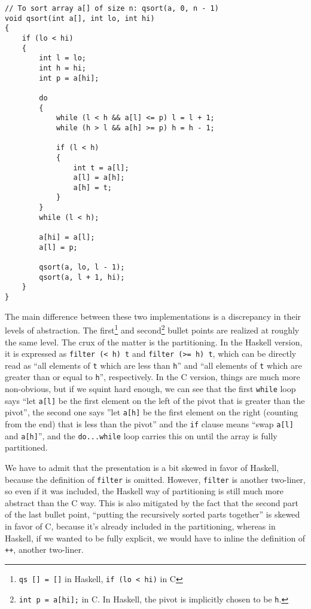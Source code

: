 \documentclass[declaration,mgr,english,shortabstract]{iithesis}
\newcommand{\m}[1]{\texttt{#1}}
\begin{document}
\begin{verbatim}
// To sort array a[] of size n: qsort(a, 0, n - 1)
void qsort(int a[], int lo, int hi)
{
    if (lo < hi)
    {
        int l = lo;
        int h = hi;
        int p = a[hi];

        do
        {
            while (l < h && a[l] <= p) l = l + 1;
            while (h > l && a[h] >= p) h = h - 1;

            if (l < h)
            {
                int t = a[l];
                a[l] = a[h];
                a[h] = t;
            }
        }
        while (l < h);

        a[hi] = a[l];
        a[l] = p;

        qsort(a, lo, l - 1);
        qsort(a, l + 1, hi);
    }
}
\end{verbatim}

The main difference between these two implementations is a discrepancy in their levels of abstraction. The first\footnote{\m{qs\ []\ =\ []} in Haskell, \m{if\ (lo\ <\ hi)} in C} and second\footnote{\m{int\ p\ =\ a[hi];} in C. In Haskell, the pivot is implicitly chosen to be \m{h}.} bullet points are realized at roughly the same level. The crux of the matter is the partitioning. In the Haskell version, it is expressed as \m{filter (< h) t} and \m{filter (>= h) t}, which can be directly read as ``all elements of \m{t} which are less than \m{h}'' and ``all elements of \m{t} which are greater than or equal to \m{h}'', respectively. In the C version, things are much more non-obvious, but if we squint hard enough, we can see that the first \m{while} loop says ``let \m{a[l]} be the first element on the left of the pivot that is greater than the pivot'', the second one says ''let \m{a[h]} be the first element on the right (counting from the end) that is less than the pivot'' and the \m{if} clause means ``swap \m{a[l]} and \m{a[h]}'', and the \m{do...while} loop carries this on until the array is fully partitioned.

We have to admit that the presentation is a bit skewed in favor of Haskell, because the definition of \m{filter} is omitted. However, \m{filter} is another two-liner, so even if it was included, the Haskell way of partitioning is still much more abstract than the C way. This is also mitigated by the fact that the second part of the last bullet point, ``putting the recursively sorted parts together'' is skewed in favor of C, because it's already included in the partitioning, whereas in Haskell, if we wanted to be fully explicit, we would have to inline the definition of \m{++}, another two-liner.
\end{document}
